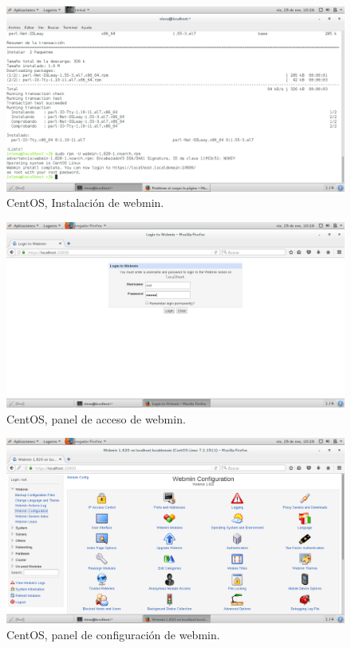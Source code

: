 \begin{figure}[H] 
	\centering
	\includegraphics[width=15cm]{./img/ejercicio12_3.png} 	
	\caption{CentOS, Instalación de webmin.} \label{fig:ejercicio12_3}
\end{figure}

\begin{figure}[H] 
	\centering
	\includegraphics[width=15cm]{./img/ejercicio12_4.png} 	
	\caption{CentOS, panel de acceso de webmin.} \label{fig:ejercicio12_4}
\end{figure}

\begin{figure}[H] 
	\centering
	\includegraphics[width=15cm]{./img/ejercicio12_5.png} 	
	\caption{CentOS, panel de configuración de webmin.} \label{fig:ejercicio12_5}
\end{figure}

